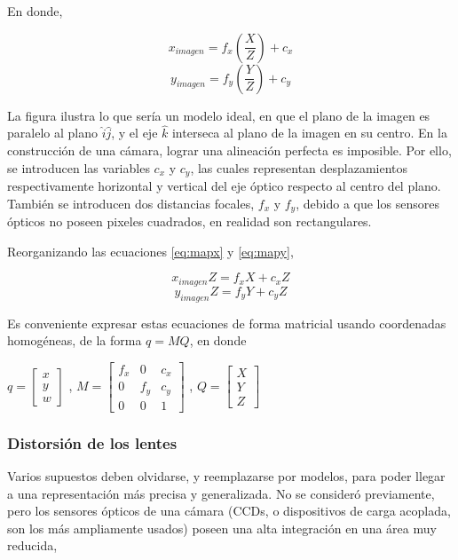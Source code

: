 \documentclass[11pt]{article}
\begin{document}
    En donde,

\begin{equation} \label{eq:mapx}
    x_{imagen} = f_x\left(\frac{X}{Z}\right)+c_x
\end{equation}\begin{equation} \label{eq:mapy}
    y_{imagen} = f_y\left(\frac{Y}{Z}\right)+c_y
\end{equation}

    La figura ilustra lo que sería un modelo ideal, en que el plano de la
imagen es paralelo al plano \(\hat{i}\hat{j}\), y el eje \(\hat{k}\)
interseca al plano de la imagen en su centro. En la construcción de una
cámara, lograr una alineación perfecta es imposible. Por ello, se
introducen las variables \(c_x\) y \(c_y\), las cuales representan
desplazamientos respectivamente horizontal y vertical del eje óptico
respecto al centro del plano. También se introducen dos distancias
focales, \(f_x\) y \(f_y\), debido a que los sensores ópticos no poseen
pixeles cuadrados, en realidad son rectangulares.

    Reorganizando las ecuaciones \ref{eq:mapx} y \ref{eq:mapy},

    \[x_{imagen} Z = f_x X + c_x Z\] \[y_{imagen} Z = f_y Y + c_y Z\]

    Es conveniente expresar estas ecuaciones de forma matricial usando
coordenadas homogéneas, de la forma \(q = MQ\), en donde

    \begin{center}
$q =
\begin{bmatrix}
    x \\[0.3em]
    y \\[0.3em]
    w
\end{bmatrix}$ , 
$M = 
\begin{bmatrix}
f_x &  0  & c_x  \\[0.3em]
 0  & f_y & c_y  \\[0.3em]
 0  &  0  &  1
\end{bmatrix}$ ,
$Q =
\begin{bmatrix}
    X \\[0.3em]
    Y \\[0.3em]
    Z
\end{bmatrix}$
\end{center}

    \subsubsection{Distorsión de los
lentes}\label{distorsiuxf3n-de-los-lentes}

    Varios supuestos deben olvidarse, y reemplazarse por modelos, para poder
llegar a una representación más precisa y generalizada. No se consideró
previamente, pero los sensores ópticos de una cámara (CCDs, o
dispositivos de carga acoplada, son los más ampliamente usados) poseen
una alta integración en una área muy reducida,


    
    



    
    
\end{document}
